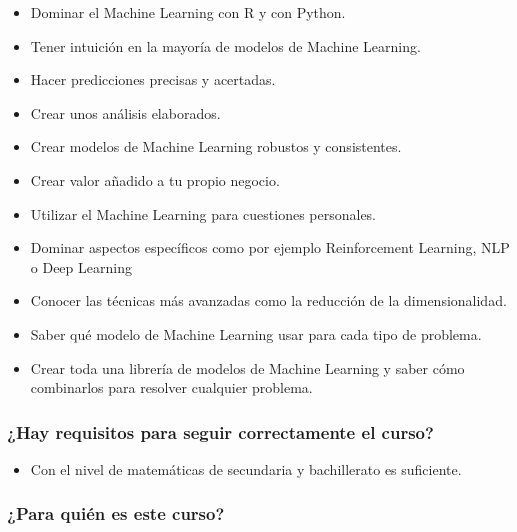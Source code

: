 \documentclass[]{article}
\providecommand{\tightlist}{%
  \setlength{\itemsep}{0pt}\setlength{\parskip}{0pt}}
\begin{document}
\begin{itemize}
\tightlist
\item
  Dominar el Machine Learning con R y con Python.
\item
  Tener intuición en la mayoría de modelos de Machine Learning.
\item
  Hacer predicciones precisas y acertadas.
\item
  Crear unos análisis elaborados.
\item
  Crear modelos de Machine Learning robustos y consistentes.
\item
  Crear valor añadido a tu propio negocio.
\item
  Utilizar el Machine Learning para cuestiones personales.
\item
  Dominar aspectos específicos como por ejemplo Reinforcement Learning,
  NLP o Deep Learning
\item
  Conocer las técnicas más avanzadas como la reducción de la
  dimensionalidad.
\item
  Saber qué modelo de Machine Learning usar para cada tipo de problema.
\item
  Crear toda una librería de modelos de Machine Learning y saber cómo
  combinarlos para resolver cualquier problema.
\end{itemize}

\hypertarget{hay-requisitos-para-seguir-correctamente-el-curso}{%
\subsubsection{¿Hay requisitos para seguir correctamente el
curso?}\label{hay-requisitos-para-seguir-correctamente-el-curso}}

\begin{itemize}
\tightlist
\item
  Con el nivel de matemáticas de secundaria y bachillerato es
  suficiente.
\end{itemize}

\hypertarget{para-quiuxe9n-es-este-curso}{%
\subsubsection{¿Para quién es este
curso?}\label{para-quiuxe9n-es-este-curso}}
\end{document}
